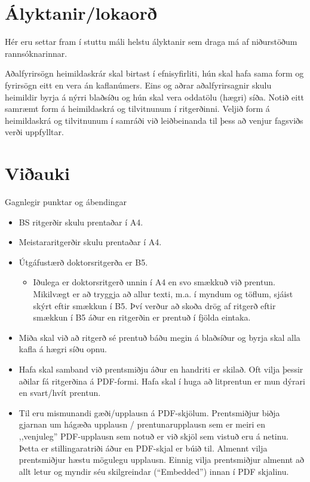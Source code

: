 \documentclass[a4paper,12pt,twoside,BCOR=10mm]{scrbook}
\begin{document}
\chapter{Ályktanir/lokaorð}
Hér eru settar fram í stuttu máli helstu ályktanir sem draga má af niðurstöðum rannsóknarinnar.

%
%
\printbibliography[heading=bibintoc] %

Aðalfyrirsögn heimildaskrár skal birtast í efnisyfirliti, hún skal hafa sama form og fyrirsögn eitt en vera án kaflanúmers. Eins og aðrar aðalfyrirsagnir skulu heimildir byrja á nýrri blaðsíðu og hún skal vera oddatölu (hægri) síða.
Notið eitt samræmt form á heimildaskrá og tilvitnunum í ritgerðinni. Veljið form á heimildaskrá og tilvitnunum í samráði við leiðbeinanda til þess að venjur fagsviðs verði uppfylltar.


%
%
\appendix
\renewcommand{\chaptername}{Viðauki}
\chapter{Viðauki}
Gagnlegir punktar og ábendingar
\begin{itemize}
 \item BS ritgerðir skulu prentaðar í A4.
 \item Meistararitgerðir skulu prentaðar í A4.
 \item Útgáfustærð doktorsritgerða er B5.
\begin{itemize}
 \item[-] Iðulega er doktorsritgerð unnin í A4 en svo smækkuð við prentun. Mikilvægt er að tryggja að allur texti, m.a. í myndum og töflum, sjáist skýrt eftir smækkun í B5. Því verður að skoða drög af ritgerð eftir smækkun í B5 áður en ritgerðin er prentuð í fjölda eintaka.
\end{itemize}

\end{itemize}

\begin{itemize}
 \item Miða skal við að ritgerð sé prentuð báðu megin á blaðsíður og byrja skal alla kafla á hægri síðu opnu.
 \item Hafa skal samband við prentsmiðju áður en handriti er skilað. Oft vilja þessir aðilar fá ritgerðina á PDF-formi. Hafa skal í huga að litprentun er mun dýrari en svart/hvít prentun. 
 \item Til eru mismunandi gæði/upplausn á PDF-skjölum. Prentsmiðjur biðja gjarnan um hágæða upplausn / prentunarupplausn sem er meiri en ,,venjuleg” PDF-upplausn sem notuð er við skjöl sem vistuð eru á netinu. Þetta er stillingaratriði áður en PDF-skjal er búið til. Almennt vilja prentsmiðjur hæstu mögulegu upplausn. Einnig vilja prentsmiðjur almennt að allt letur og myndir séu skilgreindar (“Embedded”) innan í PDF skjalinu.
\end{itemize}
\end{document}

